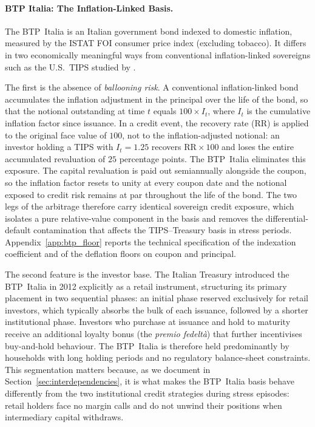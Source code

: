 
\paragraph{BTP Italia: The Inflation-Linked Basis.}

The BTP~Italia is an Italian government bond indexed to domestic
inflation, measured by the ISTAT FOI consumer price index (excluding
tobacco). It differs in two economically meaningful ways from
conventional inflation-linked sovereigns such as the U.S.\ TIPS
studied by \citet{fleckenstein2014tips}.

The first is the absence of \emph{ballooning risk}. A conventional
inflation-linked bond accumulates the inflation adjustment in the
principal over the life of the bond, so that the notional outstanding
at time $t$ equals $100 \times I_t$, where $I_t$ is the cumulative
inflation factor since issuance. In a credit event, the recovery rate
($\text{RR}$) is applied to the original face value of $100$, not to
the inflation-adjusted notional: an investor holding a TIPS with
$I_t = 1.25$ recovers $\text{RR} \times 100$ and loses the entire
accumulated revaluation of $25$ percentage points. The BTP~Italia
eliminates this exposure. The capital revaluation is paid out
semiannually alongside the coupon, so the inflation factor resets to
unity at every coupon date and the notional exposed to credit risk
remains at par throughout the life of the bond. The two legs of the
arbitrage therefore carry identical sovereign credit exposure, which
isolates a pure relative-value component in the basis and removes the
differential-default contamination that affects the TIPS--Treasury
basis in stress periods. Appendix~\ref{app:btp_floor} reports the
technical specification of the indexation coefficient and of the
deflation floors on coupon and principal.

The second feature is the investor base. The Italian Treasury
introduced the BTP~Italia in 2012 explicitly as a retail instrument,
structuring its primary placement in two sequential phases: an initial
phase reserved exclusively for retail investors, which typically
absorbs the bulk of each issuance, followed by a shorter institutional
phase. Investors who purchase at issuance and hold to maturity receive
an additional loyalty bonus (the \textit{premio fedelt\`{a}}) that
further incentivises buy-and-hold behaviour. The BTP~Italia is
therefore held predominantly by households with long holding periods
and no regulatory balance-sheet constraints. This segmentation matters
because, as we document in Section~\ref{sec:interdependencies}, it is
what makes the BTP~Italia basis behave differently from the two
institutional credit strategies during stress episodes: retail holders
face no margin calls and do not unwind their positions when
intermediary capital withdraws.


